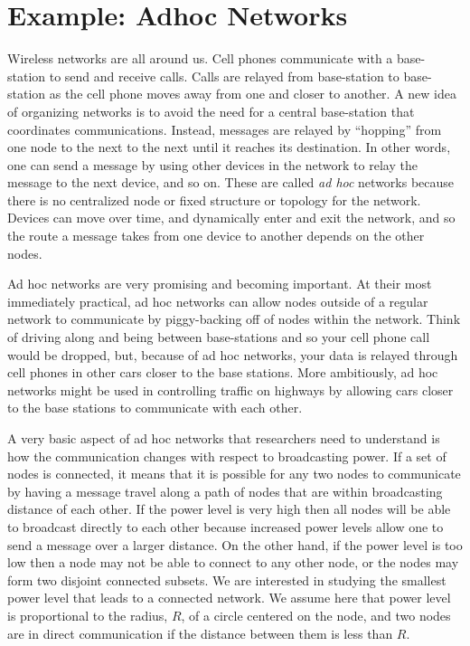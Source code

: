\section{Example: Adhoc Networks}

Wireless networks are all around us.  Cell phones communicate with a
base-station to send and receive calls.  Calls are relayed from
base-station to base-station as the cell phone moves away from one and
closer to another.  A new idea of organizing networks is to avoid the
need for a central base-station that coordinates communications.
Instead, messages are relayed by ``hopping'' from one node to the next
to the next until it reaches its destination.  In other words, one can
send a message by using other devices in the network to relay the
message to the next device, and so on.  These are called \textit{ad
  hoc} networks because there is no centralized node or fixed
structure or topology for the network.  Devices can move over time,
and dynamically enter and exit the network, and so the route a message
takes from one device to another depends on the other nodes.

Ad hoc networks are very promising and becoming important.  At their
most immediately practical, ad hoc networks can allow nodes outside of
a regular network to communicate by piggy-backing off of nodes within
the network.  Think of driving along and being between base-stations
and so your cell phone call would be dropped, but, because of ad hoc
networks, your data is relayed through cell phones in other cars
closer to the base stations.  More ambitiously, ad hoc networks might
be used in controlling traffic on highways by allowing cars
closer to the base stations to communicate with each other.

A very basic aspect of ad hoc networks that researchers need to
understand is how the communication changes with respect to
broadcasting power.  If a set of nodes is connected, it means that it
is possible for any two nodes to communicate by having a message
travel along a path of nodes that are within broadcasting distance of
each other.  If the power level is very high then all nodes will be
able to broadcast directly to each other because increased power
levels allow one to send a message over a larger distance.  On the
other hand, if the power level is too low then a node may not be able
to connect to any other node, or the nodes may form two disjoint
connected subsets.  We are interested in studying the smallest power
level that leads to a connected network. We assume here that power
level is proportional to the radius, $R$, of a circle centered on the
node, and two nodes are in direct communication if the distance
between them is less than $R$.


